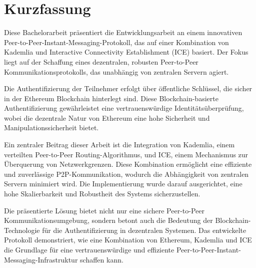 \chapter*{Kurzfassung}

Diese Bachelorarbeit präsentiert die Entwicklungsarbeit an einem innovativen Peer-to-Peer-Instant-Messaging-Protokoll, das auf einer Kombination von Kademlia und Interactive Connectivity Establishment (ICE) basiert. Der Fokus liegt auf der Schaffung eines dezentralen, robusten Peer-to-Peer Kommunikationsprotokolls, das unabhängig von zentralen Servern agiert.

Die Authentifizierung der Teilnehmer erfolgt über öffentliche Schlüssel, die sicher in der Ethereum Blockchain hinterlegt sind. Diese Blockchain-basierte Authentifizierung gewährleistet eine vertrauenswürdige Identitätsüberprüfung, wobei die dezentrale Natur von Ethereum eine hohe Sicherheit und Manipulationssicherheit bietet.

Ein zentraler Beitrag dieser Arbeit ist die Integration von Kademlia, einem verteilten Peer-to-Peer Routing-Algorithmus, und ICE, einem Mechanismus zur Überquerung von Netzwerkgrenzen. Diese Kombination ermöglicht eine effiziente und zuverlässige P2P-Kommunikation, wodurch die Abhängigkeit von zentralen Servern minimiert wird. Die Implementierung wurde darauf ausgerichtet, eine hohe Skalierbarkeit und Robustheit des Systems sicherzustellen.

Die präsentierte Lösung bietet nicht nur eine sichere Peer-to-Peer Kommunikationsumgebung, sondern betont auch die Bedeutung der Blockchain-Technologie für die Authentifizierung in dezentralen Systemen. Das entwickelte Protokoll demonstriert, wie eine Kombination von Ethereum, Kademlia und ICE die Grundlage für eine vertrauenswürdige und effiziente Peer-to-Peer-Instant-Messaging-Infrastruktur schaffen kann.